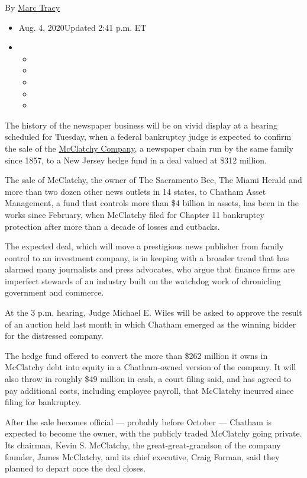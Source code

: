 By \href{https://www.nytimes3xbfgragh.onion/by/marc-tracy}{Marc Tracy}

\begin{itemize}
\item
  Aug. 4, 2020Updated 2:41 p.m. ET
\item
  \begin{itemize}
  \item
  \item
  \item
  \item
  \item
  \end{itemize}
\end{itemize}

The history of the newspaper business will be on vivid display at a
hearing scheduled for Tuesday, when a federal bankruptcy judge is
expected to confirm the sale of the
\href{https://www.nytimes3xbfgragh.onion/2020/07/12/business/media/hedge-fund-mcclatchy-newspapers.html}{McClatchy
Company}, a newspaper chain run by the same family since 1857, to a New
Jersey hedge fund in a deal valued at \$312 million.

The sale of McClatchy, the owner of The Sacramento Bee, The Miami Herald
and more than two dozen other news outlets in 14 states, to Chatham
Asset Management, a fund that controls more than \$4 billion in assets,
has been in the works since February, when McClatchy filed for Chapter
11 bankruptcy protection after more than a decade of losses and
cutbacks.

The expected deal, which will move a prestigious news publisher from
family control to an investment company, is in keeping with a broader
trend that has alarmed many journalists and press advocates, who argue
that finance firms are imperfect stewards of an industry built on the
watchdog work of chronicling government and commerce.

At the 3 p.m. hearing, Judge Michael E. Wiles will be asked to approve
the result of an auction held last month in which Chatham emerged as the
winning bidder for the distressed company.

The hedge fund offered to convert the more than \$262 million it owns in
McClatchy debt into equity in a Chatham-owned version of the company. It
will also throw in roughly \$49 million in cash, a court filing said,
and has agreed to pay additional costs, including employee payroll, that
McClatchy incurred since filing for bankruptcy.

After the sale becomes official --- probably before October --- Chatham
is expected to become the owner, with the publicly traded McClatchy
going private. Its chairman, Kevin S. McClatchy, the
great-great-grandson of the company founder, James McClatchy, and its
chief executive, Craig Forman, said they planned to depart once the deal
closes.

